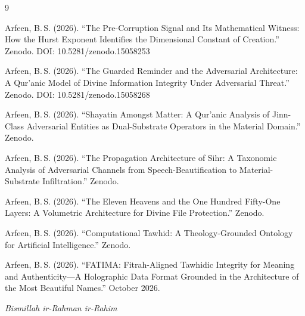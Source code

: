 \documentclass[11pt,a4paper]{article}
\begin{document}
\begin{thebibliography}{9}

Arfeen, B.\,S. (2026).
``The Pre-Corruption Signal and Its Mathematical Witness: How the Hurst Exponent Identifies the Dimensional Constant of Creation.''
Zenodo. DOI: 10.5281/zenodo.15058253

Arfeen, B.\,S. (2026).
``The Guarded Reminder and the Adversarial Architecture: A Qur'anic Model of Divine Information Integrity Under Adversarial Threat.''
Zenodo. DOI: 10.5281/zenodo.15058268

Arfeen, B.\,S. (2026).
``Shayatin Amongst Matter: A Qur'anic Analysis of Jinn-Class Adversarial Entities as Dual-Substrate Operators in the Material Domain.''
Zenodo.

Arfeen, B.\,S. (2026).
``The Propagation Architecture of Sihr: A Taxonomic Analysis of Adversarial Channels from Speech-Beautification to Material-Substrate Infiltration.''
Zenodo.

Arfeen, B.\,S. (2026).
``The Eleven Heavens and the One Hundred Fifty-One Layers: A Volumetric Architecture for Divine File Protection.''
Zenodo.

Arfeen, B.\,S. (2026).
``Computational Tawhid: A Theology-Grounded Ontology for Artificial Intelligence.''
Zenodo.

Arfeen, B.\,S. (2026).
``FATIMA: Fitrah-Aligned Tawhidic Integrity for Meaning and Authenticity---A Holographic Data Format Grounded in the Architecture of the Most Beautiful Names.''
October 2026.

\end{thebibliography}

\vspace{2em}
\begin{center}
{\Large\textcolor{bismillahgreen}{\textit{Bismillah ir-Rahman ir-Rahim}}}
\end{center}
\end{document}
